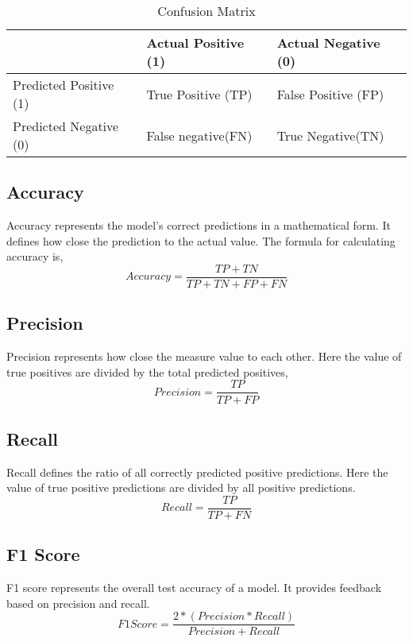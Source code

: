 \begin{table}[h!]
\centering
\begin{tabular}{|l|l|l|}
\hline
& Actual Positive (1) & Actual Negative (0)\\
\hline
Predicted Positive (1) & True Positive (TP) & False Positive (FP)  \\
\hline
Predicted Negative (0) & False negative(FN) & True Negative(TN) \\
\hline
\end{tabular}
\caption{Confusion Matrix}
\end{table}

\subsection{Accuracy}
Accuracy represents the model's correct predictions in a mathematical form. It defines how close the prediction to the actual value.
The formula for calculating accuracy is,
\begin{equation}
Accuracy = {\frac{TP+TN}{TP+TN+FP+FN}}
\end{equation}

\subsection{Precision}
Precision represents how close the measure value to each other. Here the value of true positives are divided by the total predicted positives,
\begin{equation}
Precision = {\frac{TP}{TP+FP}}
\end{equation}

\subsection{Recall}
Recall defines the ratio of all correctly predicted positive predictions. Here the value of true positive predictions are divided by all positive predictions.
\begin{equation}
Recall = {\frac{TP}{TP+FN}}
\end{equation}

\subsection{F1 Score}
F1 score represents the overall test accuracy of a model. It provides feedback based on precision and recall.
\begin{equation}
F1 Score = {\frac{2*(Precision*Recall)}{Precision+Recall}}
\end{equation}

